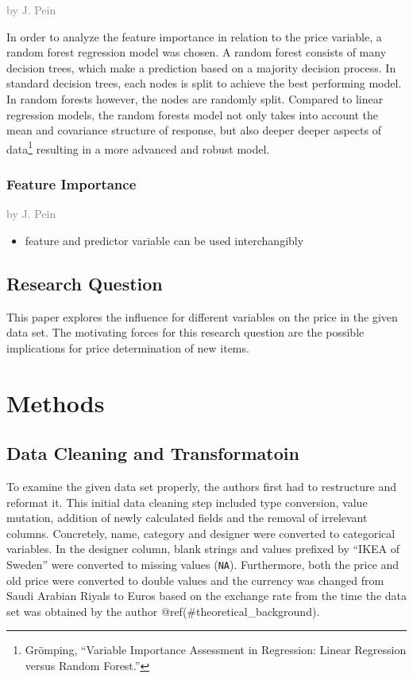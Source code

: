 \documentclass[a4paper, nobind]{templates/ociamthesis}
\providecommand{\tightlist}{%
  \setlength{\itemsep}{0pt}\setlength{\parskip}{0pt}}
\begin{document}
\textcolor{gray}{by J. Pein}

In order to analyze the feature importance in relation to the price variable, a random forest regression model was chosen. A random forest consists of many decision trees, which make a prediction based on a majority decision process. In standard decision trees, each nodes is split to achieve the best performing model. In random forests however, the nodes are randomly split. Compared to linear regression models, the random forests model not only takes into account the mean and covariance structure of response, but also deeper deeper aspects of data\footnote{Grömping, ``Variable Importance Assessment in Regression: Linear Regression versus Random Forest.''} resulting in a more advanced and robust model.

\hypertarget{feature-importance}{%
\subsection{Feature Importance}\label{feature-importance}}

\textcolor{gray}{by J. Pein}

\begin{itemize}
\tightlist
\item
  feature and predictor variable can be used interchangibly
\end{itemize}

\hypertarget{research_question}{%
\section{Research Question}\label{research_question}}

This paper explores the influence for different variables on the price in the given data set. The motivating forces for this research question are the possible implications for price determination of new items.

\hypertarget{methods}{%
\chapter{Methods}\label{methods}}

\hypertarget{datacleaning}{%
\section{Data Cleaning and Transformatoin}\label{datacleaning}}

To examine the given data set properly, the authors first had to restructure and reformat it. This initial data cleaning step included type conversion, value mutation, addition of newly calculated fields and the removal of irrelevant columns.
Concretely, name, category and designer were converted to categorical variables. In the designer column, blank strings and values prefixed by ``IKEA of Sweden'' were converted to missing values (\texttt{NA}). Furthermore, both the price and old price were converted to double values and the currency was changed from Saudi Arabian Riyals to Euros based on the exchange rate from the time the data set was obtained by the author @ref(\#theoretical\_background).
\end{document}

